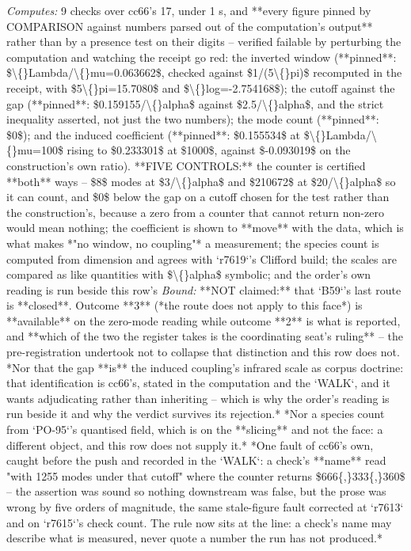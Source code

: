 \begin{description}
\emph{Computes:} 9 checks over cc66's 17, under 1 s, and **every figure pinned by COMPARISON against numbers parsed out of the computation's output** rather than by a presence test on their digits -- verified failable by perturbing the computation and watching the receipt go red: the inverted window (**pinned**: \$\textbackslash\{\}Lambda/\textbackslash\{\}mu=0.063662\$, checked against \$1/(5\textbackslash\{\}pi)\$ recomputed in the receipt, with \$5\textbackslash\{\}pi=15.7080\$ and \$\textbackslash\{\}log=-2.754168\$); the cutoff against the gap (**pinned**: \$0.159155/\textbackslash\{\}alpha\$ against \$2.5/\textbackslash\{\}alpha\$, and the strict inequality asserted, not just the two numbers); the mode count (**pinned**: \$0\$); and the induced coefficient (**pinned**: \$0.155534\$ at \$\textbackslash\{\}Lambda/\textbackslash\{\}mu=100\$ rising to \$0.233301\$ at \$1000\$, against \$-0.093019\$ on the construction's own ratio). **FIVE CONTROLS:** the counter is certified **both** ways -- \$8\$ modes at \$3/\textbackslash\{\}alpha\$ and \$210672\$ at \$20/\textbackslash\{\}alpha\$ so it can count, and \$0\$ below the gap on a cutoff chosen for the test rather than the construction's, because a zero from a counter that cannot return non-zero would mean nothing; the coefficient is shown to **move** with the data, which is what makes *"no window, no coupling"* a measurement; the species count is computed from dimension and agrees with `r7619`'s Clifford build; the scales are compared as like quantities with \$\textbackslash\{\}alpha\$ symbolic; and the order's own reading is run beside this row's
 \emph{Bound:} **NOT claimed:** that `B59`'s last route is **closed**. Outcome **3** (*the route does not apply to this face*) is **available** on the zero-mode reading while outcome **2** is what is reported, and **which of the two the register takes is the coordinating seat's ruling** -- the pre-registration undertook not to collapse that distinction and this row does not.  *Nor that the gap **is** the induced coupling's infrared scale as corpus doctrine: that identification is cc66's, stated in the computation and the `WALK`, and it wants adjudicating rather than inheriting -- which is why the order's reading is run beside it and why the verdict survives its rejection.*  *Nor a species count from `PO-95`'s quantised field, which is on the **slicing** and not the face: a different object, and this row does not supply it.*  *One fault of cc66's own, caught before the push and recorded in the `WALK`: a check's **name** read "with 1255 modes under that cutoff" where the counter returns \$666\{,\}333\{,\}360\$ -- the assertion was sound so nothing downstream was false, but the prose was wrong by five orders of magnitude, the same stale-figure fault corrected at `r7613` and on `r7615`'s check count. The rule now sits at the line: a check's name may describe what is measured, never quote a number the run has not produced.*

\end{description}
